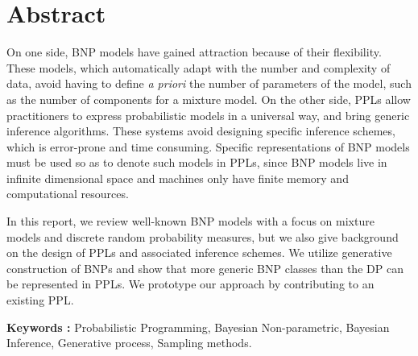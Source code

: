 \documentclass[twoside,10pt,openany,a4paper]{rapport}
\begin{document}
\chapter{Abstract}

On one side, \gls{BNP} models have gained attraction because of their flexibility. These models, which automatically adapt with the number and complexity of data, avoid having to define \textit{a priori} the number of parameters of the model, such as the number of components for a mixture model.
On the other side, \glspl{PPL} allow practitioners to express probabilistic models in a universal way, and bring generic inference algorithms. These systems avoid designing specific inference schemes, which is error-prone and time consuming.
Specific representations of \gls{BNP} models must be used so as to denote such models in \glspl{PPL}, since \gls{BNP} models live in infinite dimensional space and machines only have finite memory and computational resources.

In this report, we review well-known \gls{BNP} models with a focus on mixture models and discrete random probability measures, but we also give background on the design of \glspl{PPL} and associated inference schemes. We utilize generative construction of \glspl{BNP} and show that more generic \gls{BNP} classes than the \acrlong{DP} can be represented in \glspl{PPL}. We prototype our approach by contributing to an existing \gls{PPL}.

\textbf{Keywords :} Probabilistic Programming, Bayesian Non-parametric, Bayesian Inference, Generative process, Sampling methods.




\tableofcontents
{}


\end{document}

